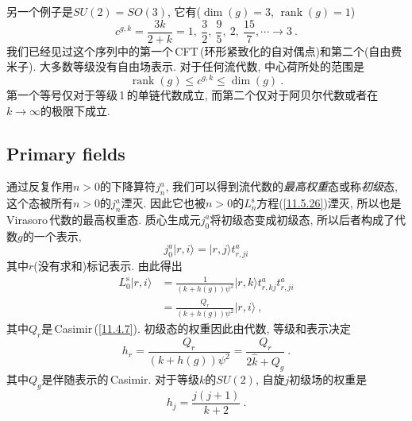 另一个例子是$ SU(2)=SO(3)$, 它有($\operatorname{dim}(g)=3$, $\operatorname{rank}(g)=1$)
\begin{equation}
    c^{g,k}=\frac{3k}{2+k} = 1,\:\frac{3}{2},\:\frac{9}{5},\:2,\:\frac{15}{7},\cdots\to3 \:. \label{11.5.36}
\end{equation}
我们已经见过这个序列中的第一个\,CFT\,(环形紧致化的自对偶点)和第二个(自由费米子). 大多数等级没有自由场表示. 对于任何流代数, 中心荷所处的范围是
\begin{equation}
    \operatorname{rank}(g)\leq c^{g,k} \leq \operatorname{dim}(g) \:. \label{11.5.37}
\end{equation}
第一个等号仅对于等级\,1\,的单链代数成立, 而第二个仅对于阿贝尔代数或者在$ k\to\infty $的极限下成立.

\subsection*{Primary fields}

通过反复作用$ n>0 $的下降算符$ j_{n}^{a}$, 我们可以得到流代数的{\emph{最高权重}}态或称{\emph{初级}}态, 这个态被所有$ n>0 $的$ j_{n}^{a} $湮灭. 因此它也被$ n>0 $的$ L_{n}^{\mathrm{s}} $方程(\ref{11.5.26})湮灭, 所以也是\,Virasoro\,代数的最高权重态. 质心生成元$ j_{0}^{a} $将初级态变成初级态, 所以后者构成了代数$ g $的一个表示,
\begin{equation}
    j_{0}^{a}\lvert r,i\rangle = \lvert r,j\rangle t_{r,ji}^{a} \label{11.5.38}
\end{equation}
其中$ r $(没有求和)标记表示. 由此得出
\begin{align}
    L_{0}^{\mathrm{s}}\lvert r,i\rangle &= \frac{1}{(k+h(g))\psi^{2}} \lvert r,k \rangle t_{r,kj}^{a}t_{r,ji}^{a} \nonumber\\ 
    &= \frac{Q_{r}}{(k+h(g))\psi^{2}} \lvert r,i \rangle \:, \label{11.5.39}
\end{align}
其中$ Q_{r} $是\,Casimir\,(\ref{11.4.7}). 初级态的权重因此由代数, 等级和表示决定
\begin{equation}
    h_{r} = \frac{Q_{r}}{(k+h(g))\psi^{2}} = \frac{Q_{r}}{2\hat{k}+Q_{g}} \:. \label{11.5.40}
\end{equation}
其中$ Q_{g} $是伴随表示的\,Casimir. 对于等级$ k $的$ SU(2)$, 自旋$ j $初级场的权重是
\begin{equation}
    h_{j} = \frac{j(j+1)}{k+2} \:. \label{11.5.41}
\end{equation}


